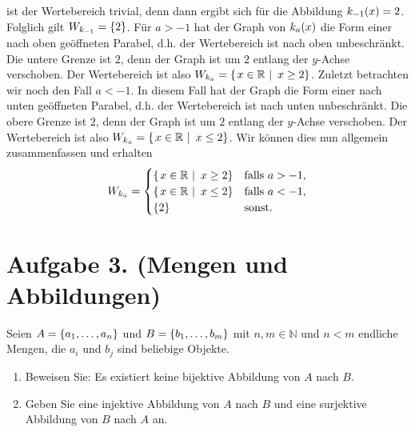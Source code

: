 \documentclass[german,12pt]{homework}
\newcommand{\NN}{\mathbb{N}}
\newcommand{\RR}{\mathbb{R}}
\DeclarePairedDelimiter{\enbrace}{(}{)}
\DeclarePairedDelimiter{\penbrace}{\{}{\}}
\begin{document}
\begin{enumerate}
        ist der Wertebereich trivial, denn dann ergibt sich für die Abbildung
        \(k_{-1}\enbrace*{x} = 2\). Folglich gilt \(W_{k_{-1}} =
        \penbrace*{2}\). Für \(a > -1\) hat der Graph von \(k_a\enbrace*{x}\)
        die Form einer nach oben geöffneten Parabel, d.h. der Wertebereich ist
        nach oben unbeschränkt. Die untere Grenze ist \(2\), denn der Graph ist
        um \(2\) entlang der \(y\)-Achse verschoben. Der Wertebereich ist also
        \(W_{k_a} = \penbrace*{\left.x \in \RR\ \right|\ x \ge 2}\). Zuletzt
        betrachten wir noch den Fall \(a < -1\). In diesem Fall hat der Graph
        die Form einer nach unten geöffneten Parabel, d.h. der Wertebereich ist
        nach unten unbeschränkt. Die obere Grenze ist \(2\), denn der Graph ist
        um \(2\) entlang der \(y\)-Achse verschoben. Der Wertebereich ist also
        \(W_{k_a} = \penbrace*{\left.x \in \RR\ \right|\ x \le 2}\). Wir können
        dies nun allgemein zusammenfassen und erhalten
        \[W_{k_a} = \begin{cases}
            \penbrace*{\left.x \in \RR\ \right|\ x \ge 2} & \text{falls }a > -
            1,\\
            \penbrace*{\left.x \in \RR\ \right|\ x \le 2} & \text{falls }a < -
            1,\\
            \penbrace*{2} & \text{sonst.}
        \end{cases}\]
    \end{enumerate}

    \section*{Aufgabe 3. (Mengen und Abbildungen)}

    \begin{problem}
        Seien \(A = \penbrace*{a_1, \ldots, a_n}\) und \(B = \penbrace*{b_1,
        \ldots, b_m}\) mit \(n, m \in \NN\) und \(n < m\) endliche Mengen, die
        \(a_i\) und \(b_j\) sind beliebige Objekte.
        \begin{enumerate}
            \item Beweisen Sie: Es existiert keine bijektive Abbildung von
            \(A\) nach \(B\).
            \item Geben Sie eine injektive Abbildung von \(A\) nach \(B\) und
            eine surjektive Abbildung von \(B\) nach \(A\) an.
        \end{enumerate}
    \end{problem}
\end{document}
